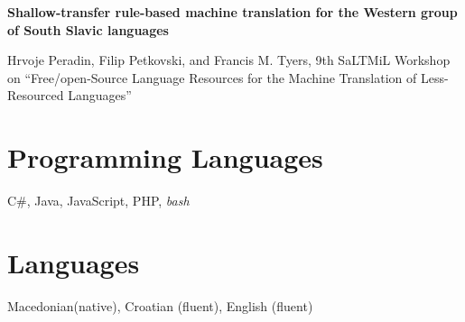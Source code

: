 \documentclass[margin,line]{resume}
\begin{document}
\begin{resume}
    \textbf{Shallow-transfer rule-based machine translation for the Western group of South Slavic languages}
    \begin{list2}
    \item Hrvoje Peradin, Filip Petkovski, and Francis M. Tyers, 9th SaLTMiL Workshop on “Free/open-Source Language Resources for the Machine Translation of Less-Resourced Languages”
    \end{list2}

    \section{\mysidestyle Programming Languages} 

    C\#, Java, JavaScript, PHP, \textsl{bash}

    \section{\mysidestyle Languages} 

    Macedonian(native), Croatian (fluent), English (fluent)
    


\end{resume}
\end{document}

